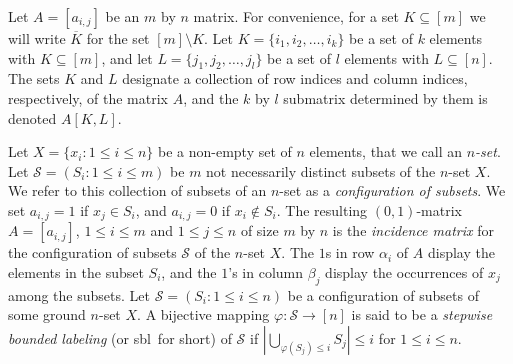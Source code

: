 \documentclass[a4paper,10pt]{llncs}
\newcommand{\SBL}{sbl}
\begin{document}
Let $A = [a_{i,j}]$ be an $m$ by $n$ matrix.
For convenience, for a set $K \subseteq [m]$ we will
write $\overline{K}$ for the set
$[m] \setminus K$.
Let $K = \{i_1, i_2, \ldots, i_k\}$ be a set of $k$ elements with
$K \subseteq [m]$,
and let $L = \{j_1, j_2, \ldots, j_l\}$ be a set of
$l$ elements with $L \subseteq [n]$.
The sets $K$ and $L$ designate a collection of row indices and column indices,
respectively, of the matrix $A$, and the $k$ by $l$ submatrix determined by them is
denoted $A[K,L]$.




Let $X = \{x_i : 1 \leq i \leq n\}$ be a non-empty set of $n$
elements, that we call an \emph{$n$-set}.
Let $\mathcal{S} = (S_i : 1 \leq i \leq m)$ be $m$ not necessarily
distinct
subsets of the $n$-set $X$. We refer to this collection of subsets of an
$n$-set as a \emph{configuration of subsets}.
We set $a_{i,j} = 1$ if $x_j \in S_i$, and $a_{i,j} = 0$
if $x_i \notin S_i$.
The resulting $(0,1)$-matrix $A = [a_{i,j}]$, $1 \leq i \leq m$ and
$1 \leq j \leq n$ of size $m$ by $n$ is the \emph{incidence matrix}
for the configuration of subsets $\mathcal{S}$ of the $n$-set $X$.
The $1$s in row $\alpha_i$ of $A$ display the elements in the subset
$S_i$, and the $1$'s in column $\beta_j$ display the occurrences of $x_j$
among the subsets. 
Let $\mathcal{S} = (S_i : 1 \leq i \leq n)$ be a configuration of subsets of some 
ground $n$-set $X$. A bijective mapping $\varphi : \mathcal{S} \to [n]$ is said to be a
\emph{stepwise bounded labeling} (or \SBL\ for short) of $\mathcal{S}$ if
$\left|\bigcup_{\varphi(S_j) \leq i}S_j\right| \leq i$
for $1 \leq i \leq n$.
\end{document}
